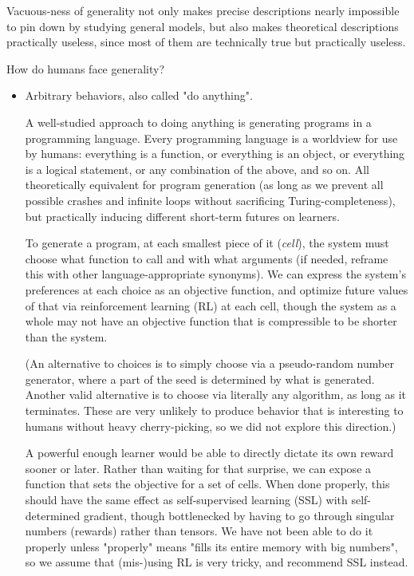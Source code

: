 \documentclass{article}
\begin{document}
Vacuous-ness of generality not only makes precise descriptions nearly impossible to pin down by studying general models, but also makes theoretical descriptions practically useless, since most of them are technically true but practically useless.

How do humans face generality?

\begin{itemize}
\item Arbitrary behaviors, also called "do anything".

A well-studied approach to doing anything is generating programs in a programming language. Every programming language is a worldview for use by humans: everything is a function, or everything is an object, or everything is a logical statement, or any combination of the above, and so on. All theoretically equivalent for program generation (as long as we prevent all possible crashes and infinite loops without sacrificing Turing-completeness), but practically inducing different short-term futures on learners.

To generate a program, at each smallest piece of it (\textit{cell}), the system must choose what function to call and with what arguments (if needed, reframe this with other language-appropriate synonyms). We can express the system's preferences at each choice as an objective function, and optimize future values of that via reinforcement learning (RL) at each cell, though the system as a whole may not have an objective function that is compressible to be shorter than the system.

(An alternative to choices is to simply choose via a pseudo-random number generator, where a part of the seed is determined by what is generated. Another valid alternative is to choose via literally any algorithm, as long as it terminates. These are very unlikely to produce behavior that is interesting to humans without heavy cherry-picking, so we did not explore this direction.)

A powerful enough learner would be able to directly dictate its own reward sooner or later. Rather than waiting for that surprise, we can expose a function that sets the objective for a set of cells. When done properly, this should have the same effect as self-supervised learning (SSL) with self-determined gradient, though bottlenecked by having to go through singular numbers (rewards) rather than tensors. We have not been able to do it properly unless "properly" means "fills its entire memory with big numbers", so we assume that (mis-)using RL is very tricky, and recommend SSL instead.


\end{itemize}
\end{document}
